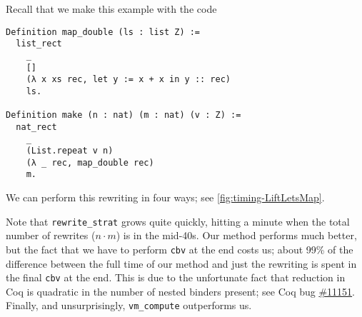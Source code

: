 \documentclass[sigplan,10pt,review,anonymous]{acmart}\settopmatter{printfolios=true,printccs=false,printacmref=false}
\newcommand{\coqbug}[1]{\href{https://github.com/coq/coq/issues/#1}{\##1}}
\begin{document}
Recall that we make this example with the code
\begin{verbatim}
Definition map_double (ls : list Z) :=
  list_rect
    _
    []
    (λ x xs rec, let y := x + x in y :: rec)
    ls.

Definition make (n : nat) (m : nat) (v : Z) :=
  nat_rect
    _
    (List.repeat v n)
    (λ _ rec, map_double rec)
    m.
\end{verbatim}

We can perform this rewriting in four ways; see \autoref{fig:timing-LiftLetsMap}.

Note that \texttt{rewrite\_strat} grows quite quickly, hitting a minute when the total number of rewrites ($n \cdot m$) is in the mid-40s.
Our method performs much better, but the fact that we have to perform \texttt{cbv} at the end costs us; about 99\% of the difference between the full time of our method and just the rewriting is spent in the final \texttt{cbv} at the end.
This is due to the unfortunate fact that reduction in Coq is quadratic in the number of nested binders present; see Coq bug \coqbug{11151}.
Finally, and unsurprisingly, \texttt{vm\_compute} outperforms us.
\end{document}
